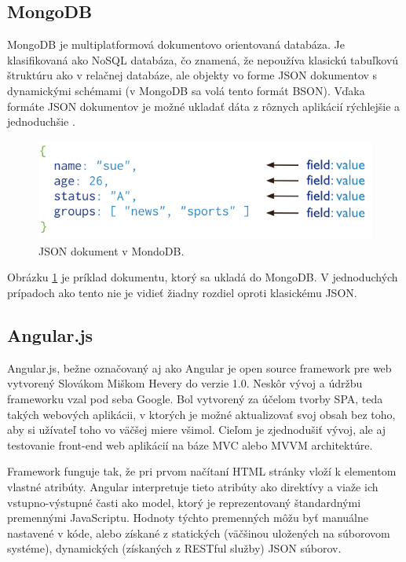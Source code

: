 \subsection{MongoDB}
MongoDB je multiplatformová dokumentovo orientovaná databáza. Je klasifikovaná ako NoSQL databáza, čo znamená, že nepoužíva klasickú tabuľkovú štruktúru ako v relačnej databáze, ale objekty vo forme JSON dokumentov s dynamickými schémami (v MongoDB sa volá tento formát BSON). Vďaka formáte JSON dokumentov je možné ukladať dáta z rôznych aplikácií rýchlejšie a jednoduchšie \cite{mongodb-wiki}.

\begin{figure}[H]
  \centering
  \includegraphics[scale=0.7]{img/mongodb/crud-annotated-document.png}
  \caption{JSON dokument v MondoDB.}
  \label{mongodb-example}
\end{figure}

Obrázku \ref{mongodb-example} je príklad dokumentu, ktorý sa ukladá do MongoDB. V jednoduchých prípadoch ako tento nie je vidieť žiadny rozdiel oproti klasickému JSON.

\subsection{Angular.js}
Angular.js, bežne označovaný aj ako Angular je open source framework pre web vytvorený Slovákom Miškom Hevery do verzie 1.0. Neskôr vývoj a údržbu frameworku vzal pod seba Google. Bol vytvorený za účelom tvorby SPA, teda takých webových aplikácii, v ktorých je možné aktualizovať svoj obsah bez toho, aby si užívateľ toho vo väčšej miere všimol. Cieľom je zjednodušiť vývoj, ale aj testovanie front-end web aplikácií na báze MVC alebo MVVM architektúre.

Framework funguje tak, že pri prvom načítaní HTML stránky vloží k elementom vlastné atribúty. Angular interpretuje tieto atribúty ako direktívy a viaže ich vstupno-výstupné časti ako model, ktorý je reprezentovaný štandardnými premennými JavaScriptu. Hodnoty týchto premenných môžu byť manuálne nastavené v kóde, alebo získané z statických (väčšinou uložených na súborovom systéme), dynamických (získaných z RESTful služby) JSON súborov.

